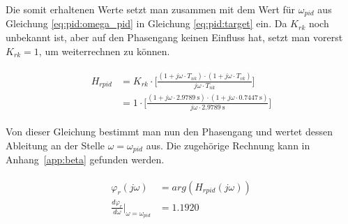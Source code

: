 Die   somit   erhaltenen    Werte   setzt   man   zusammen    mit   dem   Wert
f\"ur  $\omega_{pid}$   aus  Gleichung  \ref{eq:pid:omega_pid}   in  Gleichung
\ref{eq:pid:target}  ein.   Da  $K_{rk}$  noch unbekannt  ist,  aber  auf  den
Phasengang  keinen  Einfluss   hat,  setzt  man  vorerst  $K_{rk}   =  1$,  um
weiterrechnen zu k\"onnen.

\begin{gather} \label{eq:pid:t_nk_t_vk_initial_results}
    \begin{split}
        H_{rpid} & = K_{rk} \cdot \biggl[ \frac{(1 + j\omega \cdot T_{nk}) \cdot (1 + j\omega \cdot T_{vk}) }{ j\omega \cdot T_{nk} } \biggr] \\
                 & = 1      \cdot \biggl[ \frac{(1 + j\omega \cdot \SI{2.9789}{\second}) \cdot (1 + j\omega \cdot \SI{0.7447}{\second}) }{ j\omega \cdot  \SI{2.9789}{\second}} \biggr]
    \end{split}
\end{gather}

Von  dieser  Gleichung bestimmt  man  nun  den  Phasengang und  wertet  dessen
Ableitung an der Stelle $\omega = \omega_{pid}$ aus. Die zugeh\"orige Rechnung
kann in Anhang~\ref{app:beta} gefunden werden.

\begin{gather} \label{eq:pid:phi_r_first_iteration}
    \begin{split}
        \varphi_r (j\omega)                                            & = arg(H_{rpid}(j\omega))        \\
        \frac{d\varphi_r}{d\omega} \biggr \rvert_{\omega=\omega_{pid}} & = 1.1920
    \end{split}
\end{gather}


